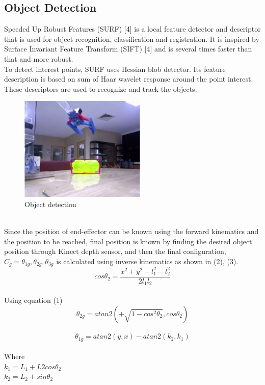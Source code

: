 \documentclass[conference]{IEEEtran}
\begin{document}
\subsection{Object Detection}
Speeded Up Robust Features (SURF) [4] is a local feature detector and descriptor that is used for object recognition, classification and registration. It is inspired by Surface Invariant Feature Transform (SIFT) [4] and is several times faster than that and more robust.\\
To detect interest points, SURF uses Hessian blob detector. Its feature description is based on sum of Haar wavelet response around the point interest. These descriptors are used to recognize and track the objects.\\
\begin{figure}[h]
\includegraphics[width=6cm]{objectdetection.png}
\centering
\caption{Object detection}\label{net_img}
\end{figure}\\
Since the position of end-effector can be known using the forward kinematics and the position to be reached, final position is known by finding the desired object position through Kinect depth sensor, and then the final configuration, $C_g={\theta_{1g},\theta_{2g},\theta_{3g}}$ is calculated using inverse kinematics as shown in (2), (3).\\
\begin{equation} \label{eq:1}
cos\theta_2=\frac{x^2+y^2-l_1^2-l_2^2}{2l_1l_2}
\end{equation}\\
Using equation (1)\\
\begin{equation} \label{eq:2}
\theta_{2g}=atan2(+\sqrt{1-cos^2\theta_2},cos\theta_2)
\end{equation}\\

\begin{equation} \label{eq:3}
\theta_{1g}=atan2(y,x)-atan2(k_2,k_1)
\end{equation}\\
Where \\
$k_1=L_1+L2cos\theta_2$\\
$k_2=L_2+sin\theta_2$\\
\end{document}
